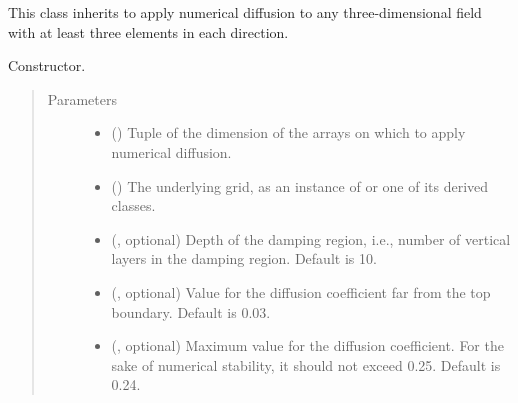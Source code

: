 \documentclass[letterpaper,10pt,english]{sphinxmanual}
\begin{document}
\begin{fulllineitems}
\label{\detokenize{api:dycore.diffusion.DiffusionXYZ}}
This class inherits {\hyperref[\detokenize{api:dycore.diffusion.Diffusion}]{}} to apply numerical diffusion to any three-dimensional
field with at least three elements in each direction.

\begin{fulllineitems}
\label{\detokenize{api:dycore.diffusion.DiffusionXYZ.__init__}}
Constructor.
\begin{quote}\begin{description}
\item[{Parameters}] \leavevmode\begin{itemize}
\item {} 
 () \textendash{} Tuple of the dimension of the arrays on which to apply numerical diffusion.

\item {} 
 () \textendash{} The underlying grid, as an instance of {\hyperref[\detokenize{api:grids.grid_xyz.GridXYZ}]{}} or one of its derived classes.

\item {} 
 (, optional) \textendash{} Depth of the damping region, i.e., number of vertical layers in the damping region. Default is 10.

\item {} 
 (, optional) \textendash{} Value for the diffusion coefficient far from the top boundary. Default is 0.03.

\item {} 
 (, optional) \textendash{} Maximum value for the diffusion coefficient. For the sake of numerical stability, it should not
exceed 0.25. Default is 0.24.


\end{itemize}
\end{description}
\end{quote}
\end{fulllineitems}
\end{fulllineitems}
\end{document}
